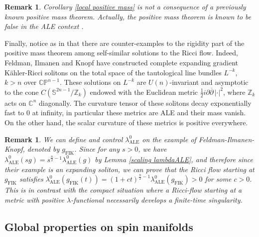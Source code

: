 \documentclass[a4paper,11pt,reqno]{amsart}
\newtheorem{rk}[defn]{Remark}
\numberwithin{equation}{section}
\begin{document}
	\begin{rk}
		Corollary \ref{local positive mass} is not a consequence of a previously known positive mass theorem. Actually, the positive mass theorem is known to be false in the ALE context \cite{LeB-Counter-Mass}.
	\end{rk}
	
	Finally, notice as in \cite{Hal-Has-Sie} that there are counter-examples to the rigidity part of the positive mass theorem among self-similar solutions to the Ricci flow. Indeed, Feldman, Ilmanen and Knopf \cite{Fel-Ilm-Kno} have constructed complete expanding gradient K\"ahler-Ricci solitons on the total space of the tautological line bundles $L^{-k}$, $k>n$ over $\mathbb{CP}^{n-1}$. These solutions on $L^{-k}$ are $U(n)$-invariant and asymptotic to the cone $C(\mathbb{S}^{2n-1}/\mathbb{Z}_k)$ endowed with the Euclidean metric $\frac{1}{2}i\partial\overline{\partial}\, |\cdot|^2$, where $\mathbb{Z}_k$ acts on $\mathbb{C}^n$ diagonally. The curvature tensor of these solitons decay exponentially fast to $0$ at infinity, in particular these metrics are ALE and their mass vanish. On the other hand, the scalar curvature of these metrics is positive everywhere. 
	
	\begin{rk}
		We can define and control $\lambda_{\operatorname{ALE}}^0$ on the example of Feldman-Ilmanen-Knopf, denoted by $g_{\operatorname{FIK}}$. Since for any $s>0$, we have $\lambda_{\operatorname{ALE}}^0(sg) = s^{\frac{n}{2}- 1}\lambda_{\operatorname{ALE}}^0(g)$ by Lemma \ref{scaling lambdaALE}, and therefore since their example is an expanding soliton, we can prove that the Ricci flow starting at $g_{\operatorname{FIK}}$ satisfies $\lambda_{\operatorname{ALE}}^0(g_{\operatorname{FIK}}(t)) = (1+ct)^{\frac{n}{2}- 1}\lambda_{\operatorname{ALE}}^0(g_{\operatorname{FIK}})>0$ for some $c>0$. This is in contrast with the compact situation where a Ricci-flow starting at a metric with positive $\lambda$-functional necessarily develops a finite-time singularity.
	\end{rk}
	
	\subsection{Global properties on spin manifolds}~~\\
	
\end{document}
